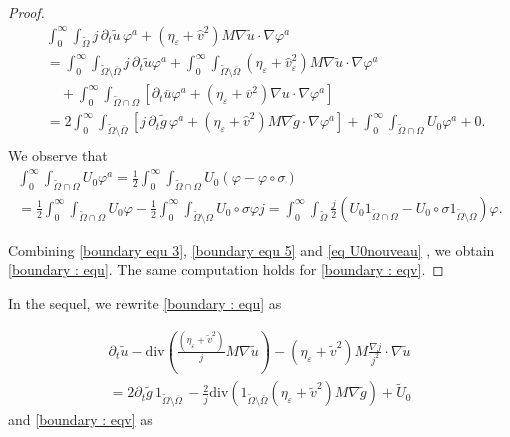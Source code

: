 \documentclass[reqno,12pt,twoside]{amsart}
\numberwithin{equation}{section} \numberwithin{theorem}{section}
\numberwithin{proposition}{section} \numberwithin{lemma}{section}
\numberwithin{corollary}{section}
\numberwithin{definition}{section} \numberwithin{remark}{section}
\begin{document}
\begin{proof}
\begin{align}\label{boundary equ 5}
&\int_0^\infty\int_{\widetilde{\Omega}} j\, \partial_t \widetilde{u}\, \varphi^a + (\eta_\varepsilon + \hat{v}^2) M \nabla \tilde{u} \cdot \nabla \varphi^a \nonumber\\
&= \int_0^\infty\int_{\widetilde{\Omega}\setminus \overline{\Omega}} j\, \partial_t \widetilde{u} \varphi^a  + \int_0^\infty\int_{\widetilde{\Omega}\setminus \overline{\Omega}} (\eta_\varepsilon + \hat{v}^2_\varepsilon ) M\nabla \widetilde{u} \cdot \nabla \varphi^a \nonumber\\
&\quad +\int_0^\infty\int_{\widetilde{\Omega}\cap \Omega} \left[\partial_t \overline{u} \varphi^a + (\eta_\varepsilon + \overline{v}^2) \nabla u \cdot \nabla \varphi^a \right] \nonumber\\
&= 2\int_0^\infty\int_{\widetilde{\Omega}\setminus \overline{\Omega}}\left[ j\,\partial_t \widetilde{g} \,\varphi^a +(\eta_\varepsilon + \hat{v}^2)M\nabla \widetilde{g} \cdot \nabla \varphi ^a\right] + \int_0^\infty\int_{\widetilde{\Omega} \cap \Omega} U_0 \varphi^a + 0. \nonumber\\
\end{align}
We observe that
\begin{multline}\label{eq U0nouveau}
\int_0^\infty\int_{\widetilde{\Omega}\cap \Omega} U_0 \varphi^a = \frac{1}{2}\int_0^\infty \int_{\widetilde{\Omega}\cap \Omega} U_0(\varphi - \varphi\circ \sigma)\\
= \frac{1}{2}\int_0^\infty\int_{\widetilde{\Omega}\cap \Omega} U_0\varphi - \frac{1}{2}\int_0^\infty\int_{\widetilde{\Omega}\setminus \Omega} U_0\circ \sigma \varphi j = \int_0^\infty \int_{\widetilde{\Omega}} \frac{j}{2}(U_0 1_{\widetilde{\Omega}\cap \Omega} - U_0\circ \sigma  1_{\widetilde{\Omega}\setminus \Omega})\varphi.
\end{multline}
%

Combining \eqref{boundary equ 3},  \eqref{boundary equ 5} and \eqref{eq U0nouveau} , we obtain \eqref{boundary : equ}. 
The same computation holds for \eqref{boundary : eqv}. 
\end{proof}

In the sequel, we rewrite \eqref{boundary : equ} as 

\begin{multline}\label{boun equ vrai}
\partial_t \widetilde{u} - \text{div}\left(\frac{(\eta_\varepsilon + \widetilde{v}^2)}{j}M \nabla \widetilde{u}\right) - (\eta_\varepsilon + \widetilde{v}^2) M \frac{\nabla j}{j^2}\cdot \nabla \widetilde{u} \\
= 2 \partial_t \widetilde{g}\,1_{\widetilde{\Omega}\setminus \overline{\Omega}}\, - \frac{2}{j} \text{div}(1_{\widetilde{\Omega}\setminus \overline{\Omega}} (\eta_\varepsilon + \widetilde{v}^2) M \nabla \widetilde{g} ) + \widetilde{U}_0
\end{multline}
and \eqref{boundary : eqv} as 
\end{document}
